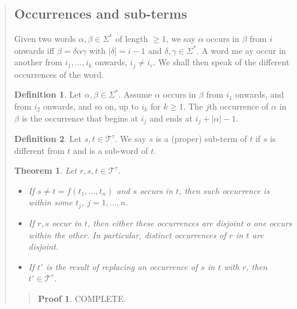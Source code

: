 \documentclass[a4paper, 12pt]{article}
\newtheorem{theorem}{Theorem}
\theoremstyle{definition}
\theoremstyle{definition}
\theoremstyle{definition}
\newtheorem{definition}{Definition}
\newtheorem{pro}{Proof}
\begin{document}
\begin{quote}
\subsection{Occurrences and sub-terms}

Given two words $\alpha, \beta \in \Sigma^{*}$ of length $\geq 1$, we say
$\alpha$ occurs in $\beta$ from $i$ onwards iff $\beta = \delta \alpha \gamma$
with $|\delta| = i - 1$ and $\delta, \gamma \in \Sigma^{*}$. A word me ay occur
in another from $i_1, \ldots, i_k$ onwards, $i_j \neq i_r$. We shall then speak
of the different occurrences of the word.

\begin{definition}
    Let $\alpha, \beta \in \Sigma^{*}$. Assume $\alpha$ occurs in $\beta$ from 
    $i_1$ onwards, and from $i_2$ onwards, and so on, up to 
    $i_k$ for $k \geq 1$. The $j$th occurrence of $\alpha$
    in $\beta$ is the occurrence that begins at 
    $i_j$ and ends at $i_j + |\alpha| - 1$.
\end{definition}

\begin{definition}
    Let $s, t \in \mathcal{T}^{\tau}$. We say $s$ is a (proper) sub-term of $t$ if $s$
    is different from $t$ and is a sub-word of $t$.
\end{definition}

\begin{theorem}
    Let $r, s, t \in \mathcal{T}^\tau$. 

    \begin{itemize}
        \item If $s \neq t = f(t_1, \ldots, t_n)$ and $s$ occurs in $t$, then such 
            occurrence is within some $t_j$, $j = 1, \ldots, n$.
        \item If $r, s$ occur in $t$, then either these occurrences are disjoint o one 
            occurs within the other. In particular, distinct occurrences of $r$
            in $t$ are disjoint. 
        \item If $t'$ is the result of replacing an occurrence of $s$ in $t$ with $r$,
            then $t' \in \mathcal{T}^\tau$.
    \end{itemize}
\end{theorem}


\small
\begin{quote}

\begin{pro}
    COMPLETE.
\end{pro}

\end{quote}
\normalsize


\end{quote}
\end{document}
